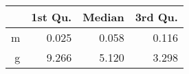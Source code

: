 \begin{table}[ht]
\centering
\begin{tabular}{rrrr}
  \hline
 & 1st Qu. & Median & 3rd Qu. \\ 
  \hline
m & 0.025 & 0.058 & 0.116 \\ 
  g & 9.266 & 5.120 & 3.298 \\ 
   \hline
\end{tabular}
\end{table}
